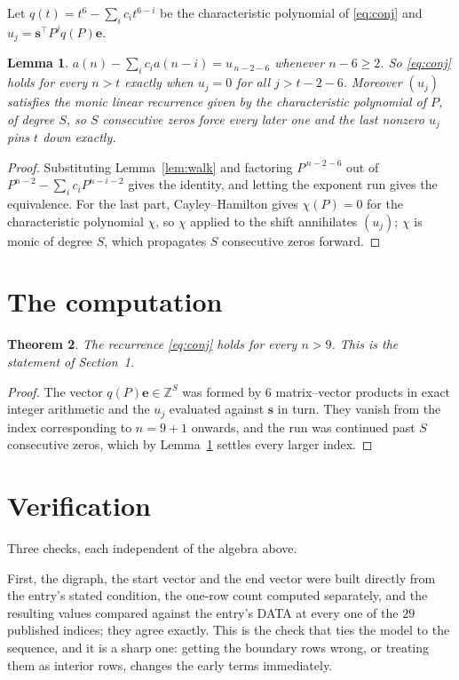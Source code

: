 \documentclass[11pt,a4paper]{article}
\theoremstyle{plain}
\newtheorem{theorem}{Theorem}
\newtheorem{lemma}[theorem]{Lemma}
\theoremstyle{definition}
\begin{document}
Let $q(t)=t^{6}-\sum_i c_i t^{6-i}$ be the characteristic polynomial of
\eqref{eq:conj} and $u_j=\mathbf{s}^{\!\top}P^{j}q(P)\mathbf{e}$.

\begin{lemma}\label{lem:crit}
$a(n)-\sum_i c_i a(n-i)=u_{\,n-2-6}$ whenever $n-6\ge2$. So \eqref{eq:conj}
holds for every $n>t$ exactly when $u_j=0$ for all $j>t-2-6$. Moreover $(u_j)$
satisfies the monic linear recurrence given by the characteristic polynomial of $P$, of
degree $S$, so $S$ consecutive zeros force every later one and the last nonzero $u_j$ pins
$t$ down exactly.
\end{lemma}

\begin{proof}
Substituting Lemma~\ref{lem:walk} and factoring $P^{\,n-2-6}$ out of
$P^{n-2}-\sum_i c_i P^{n-i-2}$ gives the identity, and letting the exponent run gives the
equivalence. For the last part, Cayley--Hamilton gives $\chi(P)=0$ for the characteristic
polynomial $\chi$, so $\chi$ applied to the shift annihilates $(u_j)$; $\chi$ is monic of
degree $S$, which propagates $S$ consecutive zeros forward.
\end{proof}

\section{The computation}

\begin{theorem}
The recurrence \eqref{eq:conj} holds for every $n>9$. This is the statement of
Section~1.
\end{theorem}

\begin{proof}
The vector $q(P)\mathbf{e}\in\mathbb{Z}^{S}$ was formed by $6$ matrix--vector
products in exact integer arithmetic and the $u_j$ evaluated against $\mathbf{s}$ in turn.
They vanish from the index corresponding to $n=9+1$ onwards, and the run was continued
past $S$ consecutive zeros, which by Lemma~\ref{lem:crit} settles every larger index.
\end{proof}

\section{Verification}

Three checks, each independent of the algebra above.

First, the digraph, the start vector and the end vector were built directly from the
entry's stated condition, the one-row count computed separately, and the resulting values
compared against the entry's DATA at every one of the $29$ published indices; they
agree exactly. This is the check that ties the model to the sequence, and it is a sharp one:
getting the boundary rows wrong, or treating them as interior rows, changes the early terms
immediately.
\end{document}
